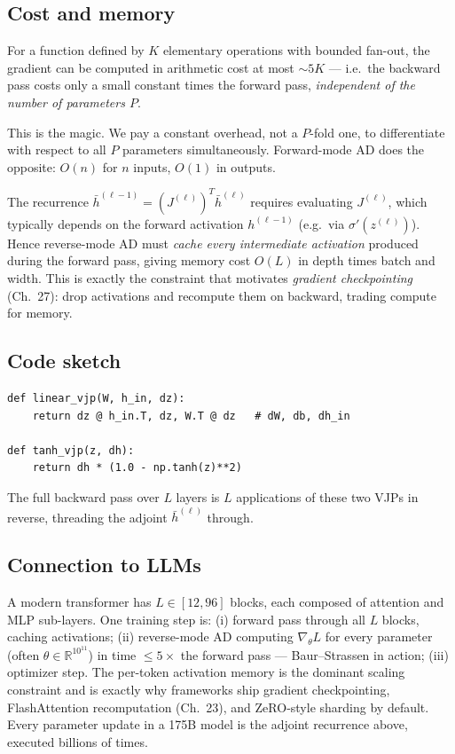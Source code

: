 \subsection*{Cost and memory}

\begin{theorem}
For a function defined by $K$ elementary operations with bounded fan-out, the
gradient can be computed in arithmetic cost at most $\sim 5K$ — i.e.\ the
backward pass costs only a small constant times the forward pass,
\emph{independent of the number of parameters $P$}.
\end{theorem}

This is the magic. We pay a constant overhead, not a $P$-fold one, to
differentiate with respect to all $P$ parameters simultaneously. Forward-mode
AD does the opposite: $O(n)$ for $n$ inputs, $O(1)$ in outputs.

\begin{remark}[Memory]
The recurrence $\bar h^{(\ell-1)}=(J^{(\ell)})^{T}\bar h^{(\ell)}$ requires
evaluating $J^{(\ell)}$, which typically depends on the forward activation
$h^{(\ell-1)}$ (e.g.\ via $\sigma'(z^{(\ell)})$). Hence reverse-mode AD must
\emph{cache every intermediate activation} produced during the forward pass,
giving memory cost $O(L)$ in depth times batch and width. This is exactly the
constraint that motivates \emph{gradient checkpointing} (Ch.~27): drop
activations and recompute them on backward, trading compute for memory.
\end{remark}

\subsection*{Code sketch}

\begin{example}
\begin{verbatim}
def linear_vjp(W, h_in, dz):
    return dz @ h_in.T, dz, W.T @ dz   # dW, db, dh_in

def tanh_vjp(z, dh):
    return dh * (1.0 - np.tanh(z)**2)
\end{verbatim}
The full backward pass over $L$ layers is $L$ applications of these two VJPs in
reverse, threading the adjoint $\bar h^{(\ell)}$ through.
\end{example}

\subsection*{Connection to LLMs}

A modern transformer has $L\in[12,96]$ blocks, each composed of attention and
MLP sub-layers. One training step is: (i) forward pass through all $L$
blocks, caching activations; (ii) reverse-mode AD computing $\nabla_\theta L$
for every parameter (often $\theta\in\mathbb{R}^{10^{11}}$) in time $\le 5\times$
the forward pass — Baur--Strassen in action; (iii) optimizer step. The
per-token activation memory is the dominant scaling constraint and is exactly
why frameworks ship gradient checkpointing, FlashAttention recomputation
(Ch.~23), and ZeRO-style sharding by default. Every parameter update in a
175B model is the adjoint recurrence above, executed billions of times.
